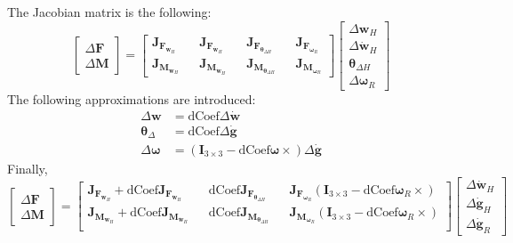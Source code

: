 The Jacobian matrix is the following:
\begin{equation}
    \begin{bmatrix}
        \Delta \mathbf{F} \\ \Delta \mathbf{M}
    \end{bmatrix} = \begin{bmatrix}
        \mathbf{J}_{\mathbf{F}_{\mathbf{w}_H}} && \mathbf{J}_{\mathbf{F}_{\dot{\mathbf{w}}_H}} && \mathbf{J}_{\mathbf{F}_{\boldsymbol{\theta}_{\Delta H}}} &&  \mathbf{J}_{\mathbf{F}_{\boldsymbol{\omega}_R}}\\
        \mathbf{J}_{\mathbf{M}_{\mathbf{w}_H}} && \mathbf{J}_{\mathbf{M}_{\dot{\mathbf{w}}_H}} && \mathbf{J}_{\mathbf{M}_{\boldsymbol{\theta}_{\Delta H}}} && \mathbf{J}_{\mathbf{M}_{\boldsymbol{\omega}_R}}
    \end{bmatrix}\begin{bmatrix}
        \Delta \mathbf{w}_H \\ \Delta {\dot{\mathbf{w}}}_H \\ \boldsymbol{\theta}_{\Delta H} \\ \Delta \boldsymbol{\omega}_R
    \end{bmatrix}
\end{equation}
The following approximations are introduced:
\begin{equation}
    \begin{split}
        \Delta \mathbf{w} &= \text{dCoef} \Delta {\dot{\mathbf{w}}}\\
        \boldsymbol{\theta}_{\Delta} &= \text{dCoef} \Delta {\dot{\mathbf{g}}}\\
        \Delta \boldsymbol{\omega} &= \left(\mathbf{I}_{3\times3} - \text{dCoef}\boldsymbol{\omega}\times\right)\Delta {\dot{\mathbf{g}}}
    \end{split}
\end{equation}
Finally,
\begin{equation}
    \begin{bmatrix}
        \Delta \mathbf{F} \\ \Delta \mathbf{M}
    \end{bmatrix} = \begin{bmatrix}
        \mathbf{J}_{\mathbf{F}_{\mathbf{w}_H}} + \text{dCoef}\mathbf{J}_{\mathbf{F}_{\dot{\mathbf{w}}_H}} && \text{dCoef}\mathbf{J}_{\mathbf{F}_{\boldsymbol{\theta}_{\Delta H}}} && \mathbf{J}_{\mathbf{F}_{\boldsymbol{\omega}_R}}\left(\mathbf{I}_{3\times3} - \text{dCoef}\boldsymbol{\omega}_R\times\right)\\
        \mathbf{J}_{\mathbf{M}_{\mathbf{w}_H}} + \text{dCoef}\mathbf{J}_{\mathbf{M}_{\dot{\mathbf{w}}_H}} && \text{dCoef}\mathbf{J}_{\mathbf{M}_{\boldsymbol{\theta}_{\Delta H}}} && \mathbf{J}_{\mathbf{M}_{\boldsymbol{\omega}_R}}\left(\mathbf{I}_{3\times3} - \text{dCoef}\boldsymbol{\omega}_R\times\right)\\
    \end{bmatrix}\begin{bmatrix}
        \Delta {\dot{\mathbf{w}}}_H  \\ \Delta \dot{\mathbf{g}}_H \\ \Delta \dot{\mathbf{g}}_R
    \end{bmatrix}
\end{equation}

